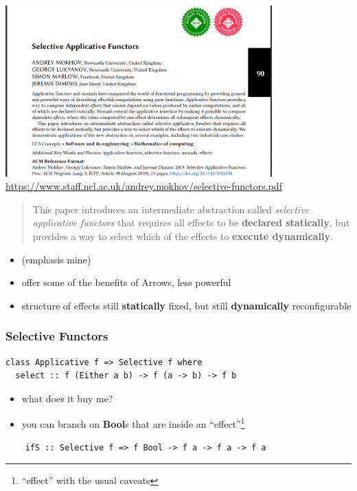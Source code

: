 \documentclass[aspectratio=169]{beamer}
\begin{document}
\begin{frame}[fragile]
  \begin{center}
    \includegraphics[width=0.77\textwidth]{static-images/selective-applicative-functors-paper.jpg}
    \vfill
    \href{https://www.staff.ncl.ac.uk/andrey.mokhov/selective-functors.pdf}{https://www.staff.ncl.ac.uk/andrey.mokhov/selective-functors.pdf}
  \end{center}
\end{frame}

\begin{frame}
    \begin{quote}
    This paper introduces an intermediate abstraction called
    \textit{selective applicative functors} that requires all effects
    to be \textbf{declared statically}, but provides a way to select which of
    the effects to \textbf{execute dynamically}.
  \end{quote}

  \begin{itemize}
  \item (emphasis mine)
  \item offer some of the benefits of Arrows, less powerful
  \item structure of effects still \textbf{statically} fixed, but still \textbf{dynamically} reconfigurable
  \end{itemize}
\end{frame}

\begin{frame}[fragile]
  \frametitle{Selective Functors}
  \begin{verbatim}
class Applicative f => Selective f where
  select :: f (Either a b) -> f (a -> b) -> f b
  \end{verbatim}
  \vspace{5mm}
  \begin{itemize}
  \item what does it buy me?
  \item you can branch on \textbf{Bool}s that are inside an ``effect''\footnote{``effect'' with the usual caveats}
  \end{itemize}
  \begin{verbatim}
    ifS :: Selective f => f Bool -> f a -> f a -> f a
  \end{verbatim}
\end{frame}
\end{document}
